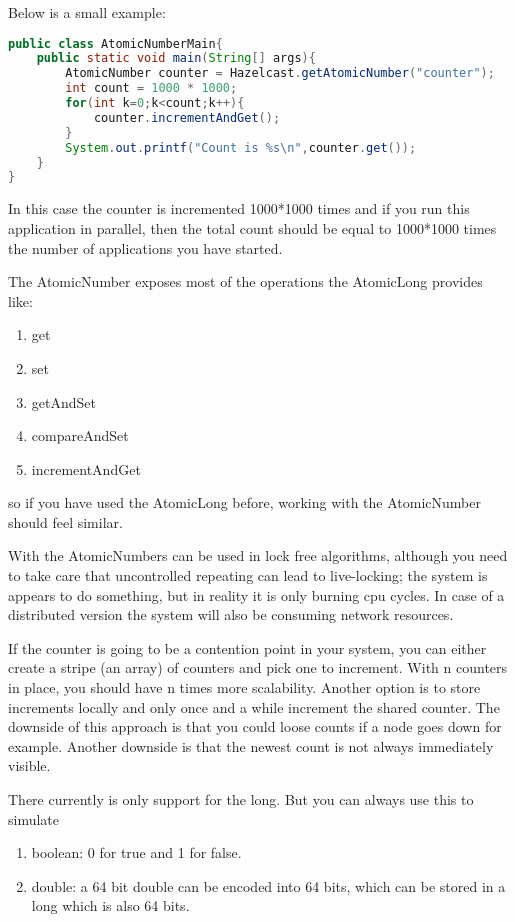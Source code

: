 Below is a small example:
\begin{lstlisting}[language=java]
public class AtomicNumberMain{
    public static void main(String[] args){
        AtomicNumber counter = Hazelcast.getAtomicNumber("counter");
        int count = 1000 * 1000;
        for(int k=0;k<count;k++){
            counter.incrementAndGet();
        }
        System.out.printf("Count is %s\n",counter.get());
    }
}
\end{lstlisting}
In this case the counter is incremented 1000*1000 times and if you run this application
in parallel, then the total count should be equal to 1000*1000 times the number of applications
you have started.

The AtomicNumber exposes most of the operations the AtomicLong provides like:
\begin{enumerate}
\item get
\item set
\item getAndSet
\item compareAndSet
\item incrementAndGet
\end{enumerate}
so if you have used the AtomicLong before, working with the AtomicNumber should feel similar.

With the AtomicNumbers can be used in lock free algorithms, although you need to 
take care that uncontrolled repeating can lead to live-locking; the system is appears to do
something, but in reality it is only burning cpu cycles. In case of a distributed version 
the system will also be consuming network resources. 

If the counter is going to be a contention point in your system, you can either create
a stripe (an array) of counters and pick one to increment. With n counters in place, you 
should have n times more scalability. Another option is to store increments locally and 
only once and a while increment the shared counter. The downside of this approach is that
you could loose counts if a node goes down for example. Another downside is that the newest
count is not always immediately visible. 

There currently is only support for the long. But you can always use this to simulate
\begin{enumerate}
\item boolean: 0 for true and 1 for false.
\item double: a 64 bit double can be encoded into 64 bits, which can be stored in a long 
      which is also 64 bits.
\end{enumerate}


